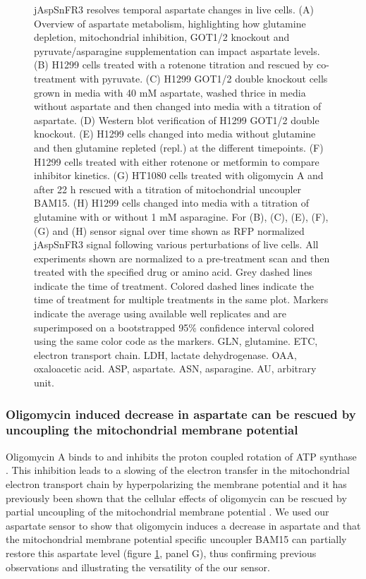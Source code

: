 \begin{figure}[ht!]
\ContinuedFloat
\caption[jAspSnFR3 resolves temporal aspartate changes in live cells.]{
    jAspSnFR3 resolves temporal aspartate changes in live cells.
    (A) Overview of aspartate metabolism, highlighting how glutamine depletion, mitochondrial inhibition, GOT1/2 knockout and pyruvate/asparagine supplementation can impact aspartate levels.
    (B) H1299 cells treated with a rotenone titration and rescued by co-treatment with pyruvate.
    (C) H1299 GOT1/2 double knockout cells grown in media with 40 mM aspartate, washed thrice in media without aspartate and then changed into media with a titration of aspartate.
    (D) Western blot verification of H1299 GOT1/2 double knockout.
    (E) H1299 cells changed into media without glutamine and then glutamine repleted (repl.) at the different timepoints.
    (F) H1299 cells treated with either rotenone or metformin to compare inhibitor kinetics.
    (G) HT1080 cells treated with oligomycin A and after 22 h rescued with a titration of mitochondrial uncoupler BAM15.
    (H) H1299 cells changed into media with a titration of glutamine with or without 1 mM asparagine.
    For (B), (C), (E), (F), (G) and (H) sensor signal over time shown as RFP normalized jAspSnFR3 signal following various perturbations of live cells.
    All experiments shown are normalized to a pre-treatment scan and then treated with the specified drug or amino acid.
    Grey dashed lines indicate the time of treatment.
    Colored dashed lines indicate the time of treatment for multiple treatments in the same plot.
    Markers indicate the average using available well replicates and are superimposed on a bootstrapped 95\% confidence interval colored using the same color code as the markers.
    GLN, glutamine.
    ETC, electron transport chain.
    LDH, lactate dehydrogenase.
    OAA, oxaloacetic acid.
    ASP, aspartate.
    ASN, asparagine.
    AU, arbitrary unit.
}
\label{ch3:fig:Fig2}
\end{figure}





\subsubsection{Oligomycin induced decrease in aspartate can be rescued by uncoupling the mitochondrial membrane potential}
Oligomycin A binds to and inhibits the proton coupled rotation of ATP synthase \cite{Symersky2012-dv}.
This inhibition leads to a slowing of the electron transfer in the mitochondrial electron transport chain by hyperpolarizing the membrane potential \cite{Brand2011-ms} and it has previously been shown that the cellular effects of oligomycin can be rescued by partial uncoupling of the mitochondrial membrane potential \cite{Sullivan2015-xf, To2019-sg}.
We used our aspartate sensor to show that oligomycin induces a decrease in aspartate and that the mitochondrial membrane potential specific uncoupler BAM15 \cite{Kenwood2014-ni} can partially restore this aspartate level (figure \ref{ch3:fig:Fig2}, panel G), thus confirming previous observations and illustrating the versatility of the our sensor.




